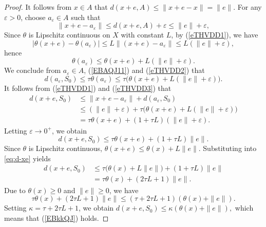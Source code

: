 \documentclass[10pt,a4paper]{amsart}
\begin{document}
\begin{proof}
	It follows from  \(x \in A\)  that \(d(x+e, A) \le \|x+e - x\| = \|e\|\).
	For any \(\varepsilon > 0\), choose \(a_\varepsilon \in A\) such that
	\begin{equation}\label{eTHVDD1}
		\|x+e - a_\varepsilon\| \le d(x+e, A) + \varepsilon \le \|e\| + \varepsilon,
	\end{equation}
	Since  \(\theta\) is Lipschitz continuous on \(X\) with constant \(L\),  by (\ref{eTHVDD1}), we have 
	\[
	|\theta(x+e) - \theta(a_\varepsilon)| \le L \|(x+e) - a_\varepsilon\| \le L(\|e\| + \varepsilon),
	\]
	hence
	\begin{equation}\label{eTHVDD2}
		\theta(a_\varepsilon) \le \theta(x+e) + L(\|e\| + \varepsilon).
	\end{equation}
	We conclude from  \(a_\varepsilon \in A\),  (\ref{EBAQJ11})  and  (\ref{eTHVDD2})  that
	\begin{equation}\label{eTHVDD3}
		d(a_\varepsilon, S_0) \le \tau \theta(a_\varepsilon) \le \tau\bigl(\theta(x+e) + L(\|e\| + \varepsilon)\bigr).
	\end{equation}
	It follows from  (\ref{eTHVDD1})  and  (\ref{eTHVDD3})    that
	\[
	\begin{aligned}
		d(x+e, S_0) &\le \|x+e - a_\varepsilon\| + d(a_\varepsilon, S_0) \\
		&\le (\|e\| + \varepsilon) + \tau\bigl(\theta(x+e) + L(\|e\| + \varepsilon)\bigr) \\
		&= \tau \theta(x+e) + (1 + \tau L)(\|e\| + \varepsilon).
	\end{aligned}
	\]
	Letting \(\varepsilon \to 0^+\), we obtain
	\begin{equation}\label{eq:d-xe}
		d(x+e, S_0) \le \tau \theta(x+e) + (1 + \tau L)\|e\|.
	\end{equation}
	Since  \(\theta\) is Lipschitz continuous, \(\theta(x+e) \le \theta(x) + L\|e\|\). Substituting into \eqref{eq:d-xe} yields
	\[
	\begin{aligned}
		d(x+e, S_0) &\le \tau\bigl(\theta(x) + L\|e\|\bigr) + (1 + \tau L)\|e\| \\
		&= \tau \theta(x) + (2\tau L + 1)\|e\|.
	\end{aligned}
	\]
	Due to  \(\theta(x) \ge 0\) and \(\|e\| \ge 0\), we have
	\[
	\tau \theta(x) + (2\tau L + 1)\|e\| \le (\tau + 2\tau L + 1)(\theta(x) + \|e\|).
	\]
	Setting \(\kappa = \tau + 2\tau L + 1\), we obtain
	$	d(x+e, S_0) \le \kappa (\theta(x) + \|e\|),$
	which means that  (\ref{EBkkQJ}) holds.
	
	
	

\end{proof}
\end{document}
